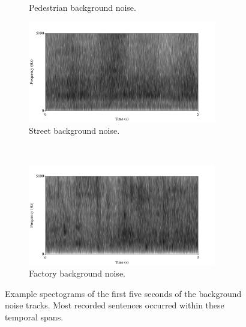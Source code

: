 \documentclass[dissertation,copyright]{uathesis}
\begin{document}
\begin{figure}[h!]
\begin{subfigure}{0.475\linewidth}
  \caption{Pedestrian background noise.}
  \label{fig:ped-bkgrnd}
\end{subfigure}
\qquad
\begin{subfigure}{0.475\linewidth}
  \centering
  \includegraphics[width=0.9\textwidth]{figure/spctgrm-str-background.png}
  \caption{Street background noise.}
  \label{fig:str-bkgrnd}
\end{subfigure}%
\\[2ex]
\begin{center}
\begin{subfigure}{0.475\linewidth}
  \centering
  \includegraphics[width=0.9\textwidth]{figure/spctgrm-fac-background.png}
  \caption{Factory background noise.}
  \label{fig:fac-bkgrnd}
\end{subfigure}
\end{center}
\caption{Example spectograms of the first five seconds of the background noise tracks. Most recorded sentences occurred within these temporal spans.}
\label{fig:bkgrnd-noises}
\end{figure}
\end{document}
